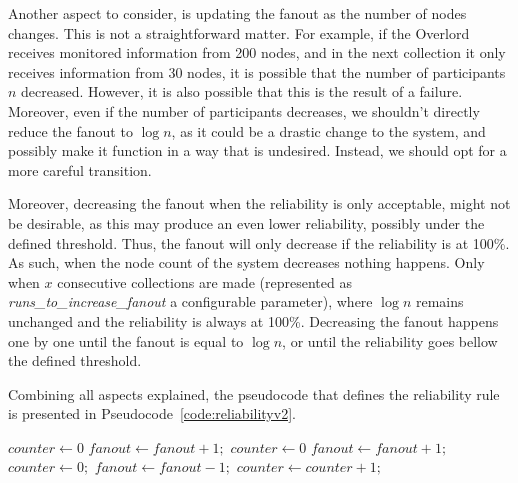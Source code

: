 Another aspect to consider, is updating the fanout as the number of nodes changes. This is not a straightforward matter. For example, if the Overlord receives monitored information from 200 nodes, and in the next collection it only receives information from 30 nodes, it is possible that the number of participants $n$ decreased. However, it is also possible that this is the result of a failure. Moreover, even if the number of participants decreases, we shouldn't directly reduce the fanout to $\log{n}$, as it could be a drastic change to the system, and possibly make it function in a way that is undesired. Instead, we should opt for a more careful transition.

Moreover, decreasing the fanout when the reliability is only acceptable, might not be desirable, as this may produce an even lower reliability, possibly under the defined threshold. Thus, the fanout will only decrease if the reliability is at 100\%. As such, when the node count of the system decreases nothing happens. Only when $x$ consecutive collections are made (represented as \textit{runs\_to\_increase\_fanout} a configurable parameter),  where $\log{n}$ remains unchanged and the reliability is always at 100\%. Decreasing the fanout happens one by one until the fanout is equal to $\log{n}$, or until the reliability goes bellow the defined threshold.

Combining all aspects explained, the pseudocode that defines the reliability rule is presented in Pseudocode~\ref{code:reliabilityv2}.
\begin{algorithm}[H]
    \caption{Handle Reliability Rule}
    \label{code:reliabilityv2}
    \begin{algorithmic}[H]
            \STATE $\textit{counter} \gets 0$
                \STATE $\textit{fanout} \gets \textit{fanout} + 1;$
            \ENDIF
            \STATE $\textit{counter} \gets 0$
            \STATE $\textit{fanout} \gets \textit{fanout} + 1;$
                \STATE $\textit{counter} \gets 0;$
                \STATE $\textit{fanout} \gets \textit{fanout} - 1;$
            \ELSE
                \STATE $\textit{counter} \gets \textit{counter} + 1;$
            \ENDIF
        \ENDIF
    \end{algorithmic}
\end{algorithm}

